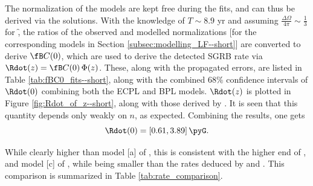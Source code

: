 The normalization of the models are kept free during the fits, and can thus be derived via the solutions. With the knowledge of $T \sim 8.9$ yr and assuming $ \frac{\Delta \Omega}{4 \pi} \sim \frac{1}{3} $ for \f, the ratios of the observed and modelled normalizations [for the corresponding models in Section \ref{subsec:modelling_LF--short}] are converted to derive $\fB C(0)$, which are used to derive the detected SGRB rate via $\Rdot(z) = \fB C(0) \, \Phi(z)$. These, along with the propagated errors, are listed in Table \ref{tab:fBC0_fits--short}, along with the combined $68\%$ confidence intervals of $\Rdot(0)$ combining both the ECPL and BPL models. $\Rdot(z)$ is plotted in Figure \ref{fig:Rdot_of_z--short}, along with those derived by . It is seen that this quantity depends only weakly on $n$, as expected. Combining the results, one gets
\begin{equation}
\Rdot(0) = [0.61, 3.89] \, \pyG.
\label{eq:Rdot0--short}
\end{equation}

While clearly higher than model [a] of , this is consistent with the higher end of ,  and model [c] of , while being smaller than the rates deduced by  and . This comparison is summarized in Table \ref{tab:rate_comparison}.


